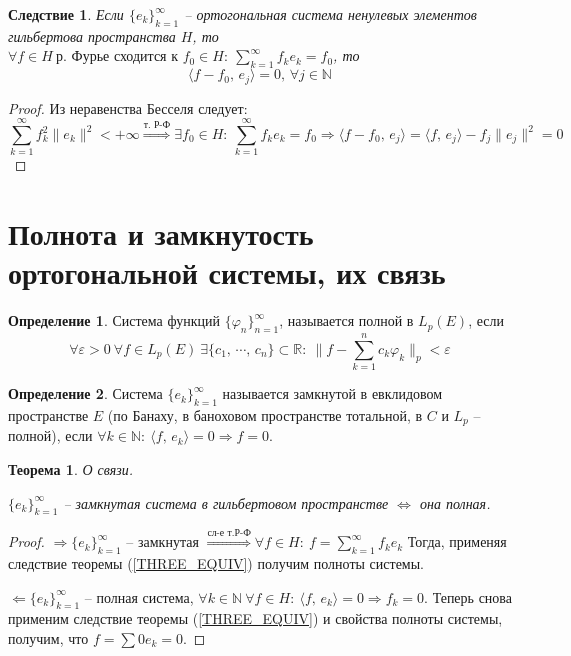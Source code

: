 \documentclass[a4paper,12pt]{article}
\renewcommand{\phi}{\ensuremath{\varphi}}
\theoremstyle{plain}
\newtheorem{theorem}{Теорема}[section]
\newtheorem*{corollary}{Следствие}
\theoremstyle{definition}
\newtheorem{definition}{Определение}[section]
\theoremstyle{remark}
\begin{document}
\begin{corollary}
	Если $\{e_k\}_{k = 1}^\infty$ -- ортогональная система ненулевых элементов гильбертова пространства $H$, то $\forall f \in H\: \text{р. Фурье сходится к }f_0 \in H:\: \sum_{k = 1}^\infty f_ke_k = f_0$, то
	\[\langle f - f_0,\, e_j\rangle = 0,\, \forall j \in \mathbb{N}\]
\end{corollary}

\begin{proof}
	Из неравенства Бесселя следует:
	\[\sum_{k = 1}^\infty f_k^2\|e_k\|^2 < +\infty \stackrel{\text{т. Р-Ф}}{\Rightarrow} \exists f_0 \in H :\: \sum_{k = 1}^\infty f_ke_k = f_0 \Rightarrow \langle f - f_0,\,e_j\rangle = \langle f,\,e_j\rangle - f_j\|e_j\|^2 = 0\]
\end{proof}

\section{Полнота и замкнутость ортогональной системы, их связь}
\begin{definition}
	Система функций $\{\phi_n\}_{n = 1}^\infty$, называется полной в $L_p(E)$, если 
	\[\forall \varepsilon > 0 \: \forall f \in L_p(E)\: \exists \{c_1,\,\cdots,\,c_n\} \subset \mathbb{R}:\: \|f - \sum_{k = 1}^n c_k\phi_k\|_p < \varepsilon\]
\end{definition}

\begin{definition}
	Система $\{e_k\}_{k = 1}^\infty$ называется замкнутой в евклидовом пространстве $E$ (по Банаху, в баноховом пространстве тотальной, в $C$ и $L_p$ -- полной), если $\forall k \in \mathbb{N}:\: \langle f,\, e_k\rangle = 0 \Rightarrow f = 0$.
\end{definition}

\begin{theorem}
	О связи.

	$\{e_k\}_{k = 1}^\infty$ -- замкнутая система в гильбертовом пространстве $\Leftrightarrow$ она полная.
\end{theorem}

\begin{proof}
	$\Rightarrow \{e_k\}_{k = 1}^\infty$ -- замкнутая $\stackrel{\text{сл-е т.Р-Ф}}{\Rightarrow} \forall f \in H:\: f = \sum_{k = 1}^\infty f_ke_k$
	Тогда, применяя следствие теоремы (\ref{THREE_EQUIV}) получим полноты системы.

	$\Leftarrow \{e_k\}_{k = 1}^\infty$ -- полная система, $\forall k \in \mathbb{N} \: \forall f \in H:\: \langle f,\,e_k\rangle = 0 \Rightarrow f_k = 0$. Теперь снова применим следствие теоремы (\ref{THREE_EQUIV}) и свойства полноты системы, получим, что $f = \sum 0e_k = 0$.
\end{proof}
\end{document}
